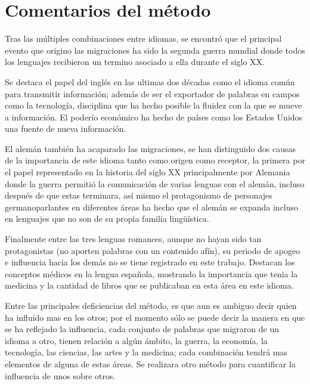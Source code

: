 \section{Comentarios del método}%


Tras las múltiples combinaciones entre idiomas, se  encontró que el principal
evento que origino las migraciones ha sido la segunda guerra mundial donde
todos los lenguajes recibieron un termino asociado a ella durante el siglo XX.

Se destaca el papel del inglés en las ultimas dos décadas como el idioma común
para transmitir información; además de ser el exportador de palabras en campos
como la tecnología, disciplina que ha hecho posible la fluidez con la que se
mueve a información. El poderío económico ha hecho de países como los Estados
Unidos una fuente de nueva información.

El alemán también ha acaparado las migraciones, se han distinguido dos causas
de la importancia de este idioma tanto como origen como receptor, la primera
por el papel representado en la historia del siglo XX principalmente por
Alemania donde la guerra permitió la comunicación de varias lenguas con el
alemán, incluso después de que estas terminara, así mismo el protagonismo de
personajes germanoparlantes en diferentes áreas ha hecho que el alemán se
expanda incluso en lenguajes que no son de su propia familia lingüística. 

Finalmente entre las tres lenguas romances, aunque no hayan sido tan
protagonistas (no aporten palabras con un contenido afín),  su periodo de
apogeo e influencia hacia los demás no se tiene registrado en este trabajo.
Destacan los conceptos médicos en la lengua española, mostrando la importancia
que tenia la medicina y la cantidad de libros que se publicaban en esta área en
este idioma. 

Entre las principales deficiencias del método, es que aun es ambiguo decir
quien ha influido mas en los otros; por el momento sólo se puede decir la
manera en que se ha reflejado la influencia, cada conjunto de palabras que
migraron de un idioma a otro, tienen relación a algún ámbito, la guerra, la
economía, la tecnología, las ciencias, las artes y la medicina; cada
combinación tendrá mas elementos de alguna de estas áreas.  Se realizara otro
método para cuantificar la influencia de unos sobre otros. 


